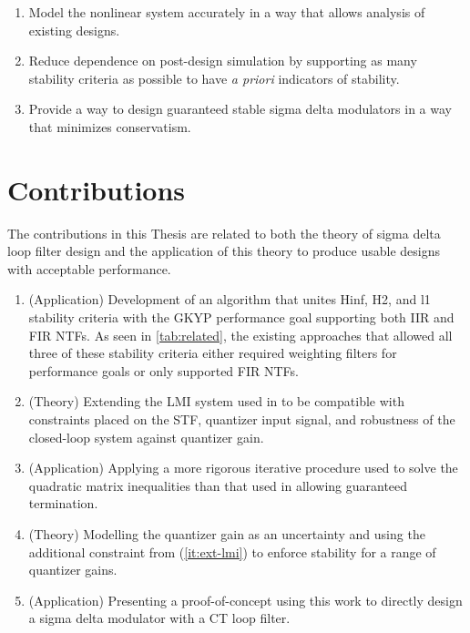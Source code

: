 \begin{enumerate}
	\item Model the nonlinear system accurately in a way that allows analysis of existing designs.
	\item Reduce dependence on post-design simulation by supporting as many stability criteria as possible to have \emph{a priori} indicators of stability.
	\item Provide a way to design guaranteed stable sigma delta modulators in a way that minimizes conservatism.
\end{enumerate}

\section{Contributions}
\label{sec:in-contrib}

The contributions in this Thesis are related to both the theory of sigma delta loop filter design and the application of this theory to produce usable designs with acceptable performance.

\begin{enumerate}
	\item (Application) Development of an algorithm that unites \gls{Hinf}, \gls{H2}, and \gls{l1} stability criteria with the \gls{GKYP} performance goal supporting both \gls{IIR} and \gls{FIR} \gls{NTF}s. As seen in \autoref{tab:related}, the existing approaches that allowed all three of these stability criteria either required weighting filters for performance goals or only supported \gls{FIR} \gls{NTF}s.
	\item (Theory) Extending the \gls{LMI} system used in \cite{Li2014} to be compatible with constraints placed on the \gls{STF}, quantizer input signal, and robustness of the closed-loop system against quantizer gain. \label{it:ext-lmi}
	\item (Application) Applying a more rigorous iterative procedure used to solve the quadratic matrix inequalities than that used in \cite{Li2014} allowing guaranteed termination. 
	\item (Theory) Modelling the quantizer gain as an uncertainty and using the additional constraint from (\ref{it:ext-lmi}) to enforce stability for a range of quantizer gains.
	\item (Application) Presenting a proof-of-concept using this work to directly design a sigma delta modulator with a \gls{CT} loop filter.
\end{enumerate}

